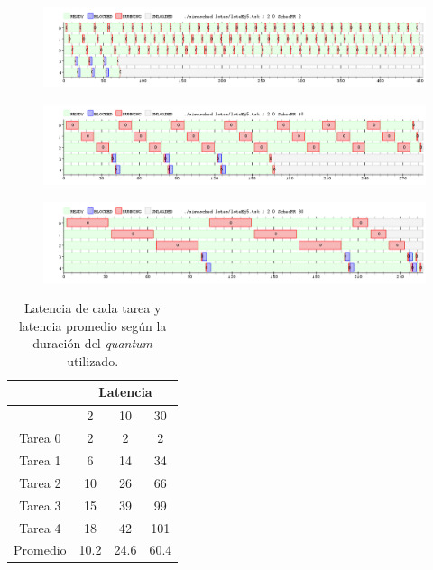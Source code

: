 \begin{figure}[H]
  \centering
  \includegraphics[width=1\textwidth]{img/imgEj5-1}
  \caption{}
  \label{fig:ej5-1}
\end{figure}

\begin{figure}[H]
  \centering
  \includegraphics[width=1\textwidth]{img/imgEj5-2}
  \caption{}
  \label{fig:ej5-2}
\end{figure}

\begin{figure}[H]
  \centering
  \includegraphics[width=1\textwidth]{img/imgEj5-3}
  \caption{}
  \label{fig:ej5-3}
\end{figure}

\begin{table}[H]
  \center
  \begin{center}
  \begin{tabular}{c|c|c|c|}
    \cline{2-4}
    & \multicolumn{3}{|c|}{\cellcolor{LightCyan}Latencia} \\
    \hline
    \rowcolor{LightCyan}
    \multicolumn{1}{|c|}{Quantum} & 2 & 10 & 30 \\
    \hline
    \multicolumn{1}{|c|}{\cellcolor{LightCyan}Tarea 0} & 2 & 2 & 2 \\
    \multicolumn{1}{|c|}{\cellcolor{LightCyan}Tarea 1} & 6 & 14 & 34 \\
    \multicolumn{1}{|c|}{\cellcolor{LightCyan}Tarea 2} & 10 & 26 & 66 \\
    \multicolumn{1}{|c|}{\cellcolor{LightCyan}Tarea 3} & 15 & 39 & 99 \\
    \multicolumn{1}{|c|}{\cellcolor{LightCyan}Tarea 4} & 18 & 42 & 101 \\
    \hline
    \multicolumn{1}{|c|}{\cellcolor{LightCyan}Promedio} & 10.2 & 24.6 & 60.4 \\
    \hline
  \end{tabular}
  \end{center}
  \caption{\footnotesize Latencia de cada tarea y latencia promedio según la duración del \emph{quantum} utilizado.}
  \label{tab:ej5-1}
\end{table}

